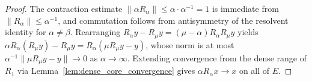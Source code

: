 \begin{proof}
\leanok
The contraction estimate $\lVert \alpha R_\alpha \rVert \le \alpha \cdot \alpha^{-1} = 1$ is immediate from $\lVert R_\alpha \rVert \le \alpha^{-1}$, and commutation follows from antisymmetry of the resolvent identity for $\alpha \ne \beta$. Rearranging $R_\alpha y - R_\mu y = (\mu - \alpha) R_\alpha R_\mu y$ yields $\alpha R_\alpha(R_\mu y) - R_\mu y = R_\alpha(\mu R_\mu y - y)$, whose norm is at most $\alpha^{-1} \lVert \mu R_\mu y - y \rVert \to 0$ as $\alpha \to \infty$. Extending convergence from the dense range of $R_1$ via Lemma~\ref{lem:dense_core_convergence} gives $\alpha R_\alpha x \to x$ on all of $E$.
\end{proof}
